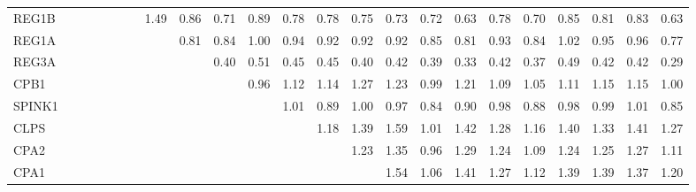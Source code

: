 \begin{longtable}{lrrrrrrrrrrrrrrrrrrrrrr}
REG1B    &              &              &              &              &             &             &        1.49 &        0.86 &       0.71 &         0.89 &       0.78 &       0.78 &       0.75 &        0.73 &      0.72 &        0.63 &           0.78 &          0.70 &      0.85 &        0.81 &        0.83 &       0.63 \\
REG1A    &              &              &              &              &             &             &             &        0.81 &       0.84 &         1.00 &       0.94 &       0.92 &       0.92 &        0.92 &      0.85 &        0.81 &           0.93 &          0.84 &      1.02 &        0.95 &        0.96 &       0.77 \\
REG3A    &              &              &              &              &             &             &             &             &       0.40 &         0.51 &       0.45 &       0.45 &       0.40 &        0.42 &      0.39 &        0.33 &           0.42 &          0.37 &      0.49 &        0.42 &        0.42 &       0.29 \\
CPB1     &              &              &              &              &             &             &             &             &            &         0.96 &       1.12 &       1.14 &       1.27 &        1.23 &      0.99 &        1.21 &           1.09 &          1.05 &      1.11 &        1.15 &        1.15 &       1.00 \\
SPINK1   &              &              &              &              &             &             &             &             &            &              &       1.01 &       0.89 &       1.00 &        0.97 &      0.84 &        0.90 &           0.98 &          0.88 &      0.98 &        0.99 &        1.01 &       0.85 \\
CLPS     &              &              &              &              &             &             &             &             &            &              &            &       1.18 &       1.39 &        1.59 &      1.01 &        1.42 &           1.28 &          1.16 &      1.40 &        1.33 &        1.41 &       1.27 \\
CPA2     &              &              &              &              &             &             &             &             &            &              &            &            &       1.23 &        1.35 &      0.96 &        1.29 &           1.24 &          1.09 &      1.24 &        1.25 &        1.27 &       1.11 \\
CPA1     &              &              &              &              &             &             &             &             &            &              &            &            &            &        1.54 &      1.06 &        1.41 &           1.27 &          1.12 &      1.39 &        1.39 &        1.37 &       1.20 \\

\end{longtable}
